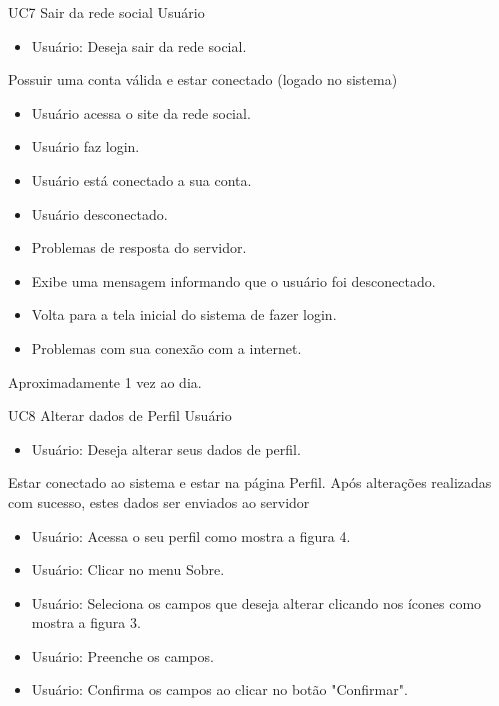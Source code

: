 \casoDeUso
{UC7}
{Sair da rede social}
{Usuário}
{
\begin{itemize}
	\item Usuário: Deseja sair da rede social.
\end{itemize}

}
{Possuir uma conta válida e estar conectado (logado no sistema)}
{}
{
\begin{itemize}
	\item Usuário acessa o site da rede social.
	\item Usuário faz login.
	\item Usuário está conectado a sua conta.
\end{itemize}
}
{
\begin{itemize}
	\item Usuário desconectado.
	\item Problemas de resposta do servidor.
	\item Exibe uma mensagem informando que o usuário foi desconectado.
	\item Volta para a tela inicial do sistema de fazer login.
	\item Problemas com sua conexão com a internet.
\end{itemize}
}
{Aproximadamente 1 vez ao dia.}
{

}
\casoDeUso
{UC8}
{Alterar dados de Perfil}
{Usuário}
{
\begin{itemize}
	\item Usuário: Deseja alterar seus dados de perfil.	
\end{itemize}
}
{Estar conectado ao sistema e estar na página Perfil.}
{Após alterações realizadas com sucesso, estes dados ser enviados ao servidor}
{
\begin{itemize}
	\item Usuário: Acessa o seu perfil como mostra a figura 4.
	\item Usuário: Clicar no menu Sobre.
	\item Usuário: Seleciona os campos que deseja alterar clicando nos ícones como mostra a figura 3.
	\item Usuário: Preenche os campos.
	\item Usuário: Confirma os campos ao clicar no botão "Confirmar".
\end{itemize}
}
